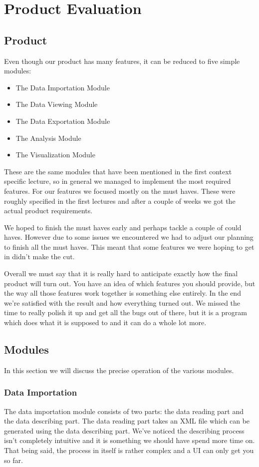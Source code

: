 \chapter{Product Evaluation} %

\section{Product}
Even though our product has many features, it can be reduced to five simple modules:
\begin{itemize}
	\item The Data Importation Module
	\item The Data Viewing Module
	\item The Data Exportation Module
	\item The Analysis Module
	\item The Visualization Module
\end{itemize}
These are the same modules that have been mentioned in the first context specific lecture, so in general we managed to implement the most required features. For our features we focused mostly on the must haves. These were roughly specified in the first lectures and after a couple of weeks we got the actual product requirements.

We hoped to finish the must haves early and perhaps tackle a couple of could haves. However due to some issues we encountered we had to adjust our planning to finish all the must haves. This meant that some features we were hoping to get in didn't make the cut.

Overall we must say that it is really hard to anticipate exactly how the final product will turn out. You have an idea of which features you should provide, but the way all those features work together is something else entirely. In the end we're satisfied with the result and how everything turned out. We missed the time to really polish it up and get all the bugs out of there, but it is a program which does what it is supposed to and it can do a whole lot more.

\section{Modules}
In this section we will discuss the precise operation of the various modules.

\subsection{Data Importation}
The data importation module consists of two parts: the data reading part and the data describing part. The data reading part takes an XML file which can be generated using the data describing part. We've noticed the describing process isn't completely intuitive and it is something we should have spend more time on. That being said, the process in itself is rather complex and a UI can only get you so far.

